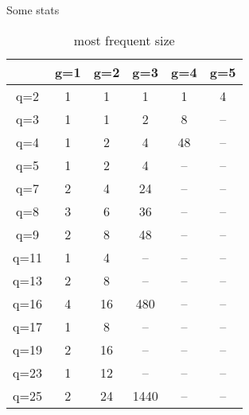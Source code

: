 \documentclass[usenames,dvipsnames,handout]{beamer}
\begin{document}
\begin{frame}{ Some stats }
    \begin{table}[h!]
        \small
        \begin{tabular}{|c|c|c|c|c|c|}\hline
            & g=1 & g=2 & g=3 & g=4 & g=5 \\\hline
            q=2 & 1 & 1 & 1 & 1 & 4 \\\hline
            q=3 & 1 & 1 & 2 & 8 &-- \\\hline
            q=4 & 1 & 2 & 4 & 48 &-- \\\hline
            q=5 & 1 & 2 & 4 &-- &-- \\\hline
            q=7 & 2 & 4 & 24 &-- &-- \\\hline
            q=8 & 3 & 6 & 36 &-- &-- \\\hline
            q=9 & 2 & 8 & 48 &-- &-- \\\hline
            q=11 & 1 & 4 &-- &-- &-- \\\hline
            q=13 & 2 & 8 &-- &-- &-- \\\hline
            q=16 & 4 & 16 & 480 &-- &-- \\\hline
            q=17 & 1 & 8 &-- &-- &-- \\\hline
            q=19 & 2 & 16 &-- &-- &-- \\\hline
            q=23 & 1 & 12 &-- &-- &-- \\\hline
            q=25 & 2 & 24 & 1440 &-- &-- \\\hline
        \end{tabular}
        \caption{most frequent size}
    \end{table}
\end{frame}
\end{document}
